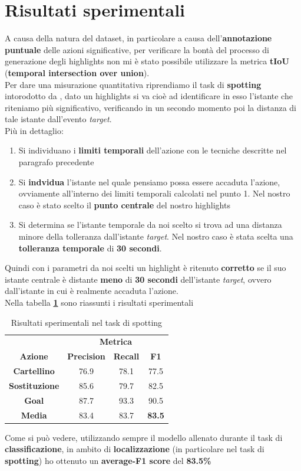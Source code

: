 \section{Risultati sperimentali}
A causa della natura del dataset, in particolare a causa dell'\textbf{annotazione puntuale} delle azioni significative, per verificare la bontà del processo di generazione degli highlights non mi è stato possibile utilizzare la metrica \textbf{tIoU} (\textbf{temporal intersection over union}).
\\Per dare una misurazione quantitativa riprendiamo il task di \textbf{spotting} intorodotto da \citet{soccerNet}, dato un highlights si va cioè ad identificare in esso l'istante che riteniamo più significativo, verificando in un secondo momento poi la distanza di tale istante dall'evento \textit{target}.
\\Più in dettaglio:
\begin{enumerate}
\item Si individuano i \textbf{limiti temporali} dell'azione con le tecniche descritte nel paragrafo precedente
\item Si \textbf{indvidua} l'istante nel quale pensiamo possa essere accaduta l'azione, ovviamente all'interno dei limiti temporali calcolati nel punto 1. Nel nostro caso è stato scelto il \textbf{punto centrale} del nostro highlights
\item Si determina se l'istante temporale da noi scelto si trova ad una distanza minore della tolleranza dall'istante \textit{target}. Nel nostro caso è stata scelta una \textbf{tolleranza temporale} di \textbf{30 secondi}.
\end{enumerate}
Quindi con i parametri da noi scelti un highlight è ritenuto \textbf{corretto} se il suo istante centrale è distante \textbf{meno} di \textbf{30 secondi} dell'istante \textit{target}, ovvero dall'istante in cui è realmente accaduta l'azione.
\\Nella tabella \textbf{\ref{table: spotting-result}} sono riassunti i risultati sperimentali
\begin{table}[ht]
\caption{Risultati sperimentali nel task di spotting}
\centering
\begin{tabular}{c| | c|c|c}
&\multicolumn{3}{c}{\textbf{Metrica}}\\
\textbf{Azione} & \textbf{Precision} & \textbf{Recall} & \textbf{F1}  \\
\hline
\textbf{Cartellino} & 76.9 & 78.1 & 77.5\\
\textbf{Sostituzione} & 85.6 & 79.7 & 82.5 \\
\textbf{Goal} & 87.7 &  93.3 & 90.5\\
\hline
\textbf{Media} & 83.4 & 83.7 & \textbf{83.5}\\ [1ex]

\end{tabular}
\label{table: spotting-result}
\end{table}

Come si può vedere, utilizzando sempre il modello allenato durante il task di \textbf{classificazione}, in ambito di \textbf{localizzazione} (in particolare nel task di \textbf{spotting}) ho ottenuto un \textbf{average-F1 score} del \textbf{83.5\%}